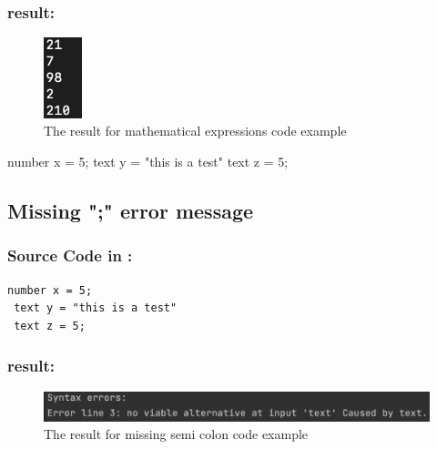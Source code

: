 \subsubsection{result:}
\begin{figure}[H] 
    \begin{center}
        \includegraphics[width=0.10\textwidth]{Files/Billeder: Appendix/MathExpr.png}
    \end{center}
    \caption{The result for mathematical expressions code example}
    \label{figure:triangleArea_result}
\end{figure}

 number x = 5;
 text y = "this is a test"
 text z = 5;

 \subsection{Missing ";" error message} \label{test_MissingSemi}

\subsubsection{Source Code in \lang:}
\begin{lstlisting}[language = scriptkid, firstnumber=1, label={list:acceptance_test_missingsemi}, caption=Acceptance test missing ";" code examples]
 number x = 5;
 text y = "this is a test"
 text z = 5;
\end{lstlisting}

\subsubsection{result:}
\begin{figure}[H] 
    \begin{center}
        \includegraphics[width=1\textwidth]{Files/Billeder: Appendix/errormsg1.png}
    \end{center}
    \caption{The result for missing semi colon code example}
    \label{figure:errorMsg1_result}
\end{figure}


